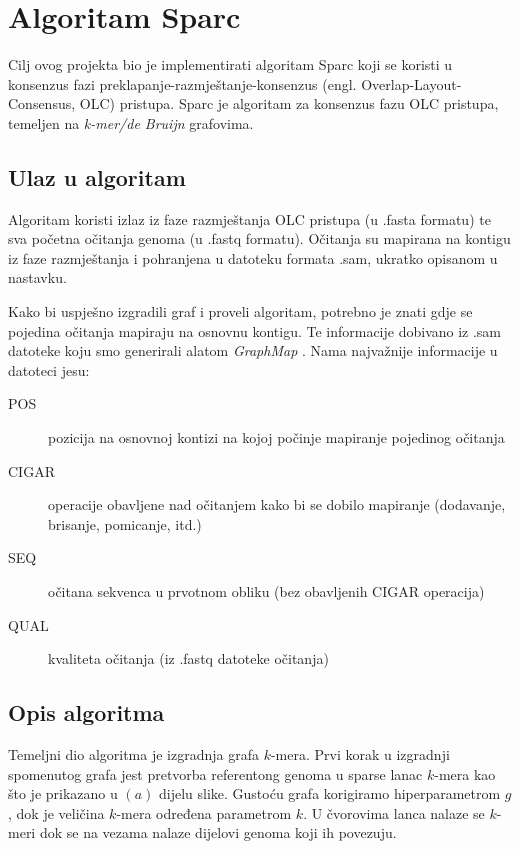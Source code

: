 \chapter{Algoritam Sparc}

Cilj ovog projekta bio je implementirati algoritam Sparc \citep{ye2016sparc} koji se koristi u konsenzus fazi preklapanje-razmještanje-konsenzus (engl. Overlap-Layout-Consensus, OLC) pristupa.
Sparc je algoritam za konsenzus fazu OLC pristupa, temeljen na \emph{k-mer/de Bruijn} \citep{hannenhalli1996positional} grafovima.

\section{Ulaz u algoritam}
Algoritam koristi izlaz iz faze razmještanja OLC pristupa (u .fasta formatu) te sva početna očitanja genoma (u .fastq formatu).
Očitanja su mapirana na kontigu iz faze razmještanja i pohranjena u datoteku formata .sam, ukratko opisanom u nastavku.

Kako bi uspješno izgradili graf i proveli algoritam, potrebno je znati gdje se pojedina očitanja mapiraju na osnovnu kontigu.
Te informacije dobivano iz .sam datoteke koju smo generirali alatom \emph{GraphMap} \citep{sovic2016fast}.
Nama najvažnije informacije u datoteci jesu:
\begin{description}
  \item [POS] pozicija na osnovnoj kontizi na kojoj počinje mapiranje pojedinog očitanja
  \item [CIGAR] operacije obavljene nad očitanjem kako bi se dobilo mapiranje (dodavanje, brisanje, pomicanje, itd.)
  \item [SEQ] očitana sekvenca u prvotnom obliku (bez obavljenih CIGAR operacija)
  \item [QUAL] kvaliteta očitanja (iz .fastq datoteke očitanja)
\end{description}


\section{Opis algoritma}
Temeljni dio algoritma je izgradnja grafa $k$-mera. Prvi korak u izgradnji spomenutog grafa jest pretvorba referentong genoma  u sparse lanac $k$-mera kao što je prikazano u $(a)$ dijelu slike. Gustoću grafa korigiramo hiperparametrom $g$, dok je veličina $k$-mera određena parametrom $k$. U čvorovima lanca nalaze se $k$-meri dok se na vezama nalaze dijelovi genoma koji ih povezuju. 

